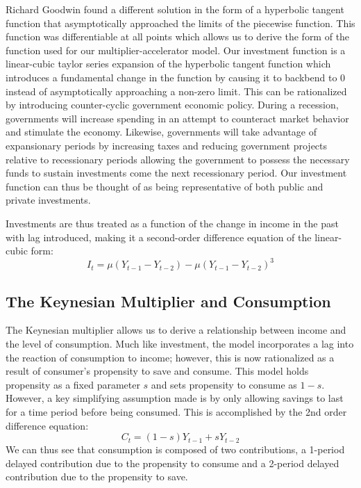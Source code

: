 Richard Goodwin found a different solution in the form of a hyperbolic tangent function that asymptotically approached the limits of the piecewise function. This function was differentiable at all points which allows us to derive the form of the function used for our multiplier-accelerator model. Our investment function is a linear-cubic taylor series expansion of the hyperbolic tangent function which introduces a fundamental change in the function by causing it to backbend to 0 instead of asymptotically approaching a non-zero limit. This can be rationalized by introducing counter-cyclic government economic policy. During a recession, governments will increase spending in an attempt to counteract market behavior and stimulate the economy. Likewise, governments will take advantage of expansionary periods by increasing taxes and reducing government projects relative to recessionary periods allowing the government to possess the necessary funds to sustain investments come the next recessionary period. Our investment function can thus be thought of as being representative of both public and private investments.\autocite{Puu2003}

Investments are thus treated as a function of the change in income in the past with lag introduced, making it a second-order difference equation of the linear-cubic form:
\begin{equation}
    I_t=\mu(Y_{t-1}-Y_{t-2})-\mu(Y_{t-1}-Y_{t-2})^3
\end{equation}
\subsection{The Keynesian Multiplier and Consumption}
The Keynesian multiplier allows us to derive a relationship between income and the level of consumption. Much like investment, the model incorporates a lag into the reaction of consumption to income; however, this is now rationalized as a result of consumer's propensity to save and consume. This model holds propensity as a fixed parameter $s$ and sets propensity to consume as $1-s$. However, a key simplifying assumption made is by only allowing savings to last for a time period before being consumed. This is accomplished by the 2nd order difference equation:
\begin{equation}
    C_t=(1-s)Y_{t-1}+sY_{t-2}
\end{equation}
We can thus see that consumption is composed of two contributions, a 1-period delayed contribution due to the propensity to consume and a 2-period delayed contribution due to the propensity to save. 
